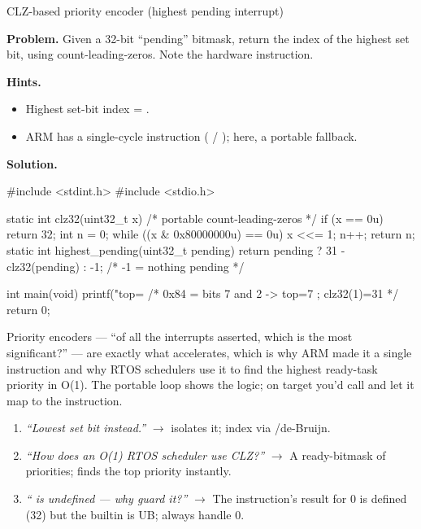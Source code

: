 \begin{gymproblem}{CLZ-based priority encoder (highest pending interrupt)}

\textbf{Problem.} Given a 32-bit ``pending'' bitmask, return the index of the
highest set bit, using count-leading-zeros. Note the hardware instruction.

\textbf{Hints.}
\begin{itemize}
\item Highest set-bit index = .
\item ARM has a single-cycle  instruction ( /
  ); here, a portable fallback.
\end{itemize}

\attempt

\textbf{Solution.}
\begin{cgym}
#include <stdint.h>
#include <stdio.h>

static int clz32(uint32_t x) {           /* portable count-leading-zeros */
    if (x == 0u) return 32;
    int n = 0;
    while ((x & 0x80000000u) == 0u) { x <<= 1; n++; }
    return n;
}
static int highest_pending(uint32_t pending) {
    return pending ? 31 - clz32(pending) : -1;   /* -1 = nothing pending */
}

int main(void) {
    printf("top=%
    /* 0x84 = bits 7 and 2 -> top=7 ; clz32(1)=31 */
    return 0;
}
\end{cgym}

Priority encoders --- ``of all the interrupts asserted, which is the most
significant?'' --- are exactly what  accelerates, which is why ARM
made it a single instruction and why RTOS schedulers use it to find the highest
ready-task priority in O(1). The portable loop shows the logic; on target you'd
call  and let it map to the instruction.

\followups
\begin{enumerate}
\item \emph{``Lowest set bit instead.''} $\rightarrow$  isolates
  it; index via /de-Bruijn.
\item \emph{``How does an O(1) RTOS scheduler use CLZ?''} $\rightarrow$ A
  ready-bitmask of priorities;  finds the top priority instantly.
\item \emph{`` is undefined --- why guard it?''}
  $\rightarrow$ The instruction's result for 0 is defined (32) but the builtin
  is UB; always handle 0.
\end{enumerate}
\end{gymproblem}

